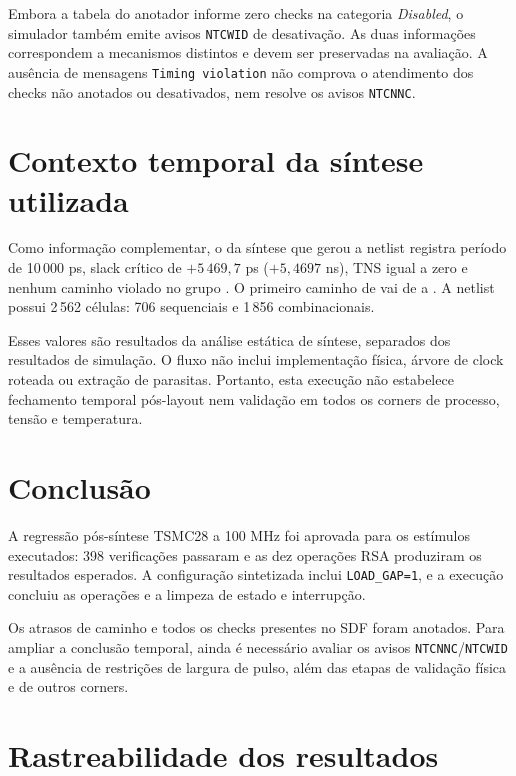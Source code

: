 \documentclass[11pt,a4paper]{article}
\begin{document}
Embora a tabela do anotador informe zero checks na categoria
\emph{Disabled}, o simulador também emite avisos \texttt{NTCWID} de
desativação. As duas informações correspondem a mecanismos distintos e
devem ser preservadas na avaliação. A ausência de mensagens
\texttt{Timing violation} não comprova o atendimento dos checks não
anotados ou desativados, nem resolve os avisos \texttt{NTCNNC}.

\section{Contexto temporal da síntese utilizada}

Como informação complementar, o  da síntese que
gerou a netlist registra período de 10\,000 ps, slack crítico de
$+5\,469{,}7$ ps ($+5{,}4697$ ns), TNS igual a zero e nenhum caminho
violado no grupo . O primeiro caminho de
 vai de  a .
A netlist possui 2\,562 células: 706 sequenciais e 1\,856 combinacionais.

Esses valores são resultados da análise estática de síntese, separados
dos resultados de simulação. O fluxo não inclui implementação física,
árvore de clock roteada ou extração de parasitas. Portanto, esta execução
não estabelece fechamento temporal pós-layout nem validação em todos
os corners de processo, tensão e temperatura.

\section{Conclusão}

A regressão pós-síntese TSMC28 a 100 MHz foi aprovada para os estímulos
executados: 398 verificações passaram e as dez operações RSA produziram
os resultados esperados. A configuração sintetizada inclui
\texttt{LOAD\_GAP=1}, e a execução concluiu as operações e a limpeza
de estado e interrupção.

Os atrasos de caminho e todos os checks presentes no SDF foram anotados.
Para ampliar a conclusão temporal, ainda é necessário avaliar os avisos
\texttt{NTCNNC}/\texttt{NTCWID} e a ausência de restrições de largura
de pulso, além das etapas de validação física e de outros corners.

\appendix
\section{Rastreabilidade dos resultados}
\end{document}
